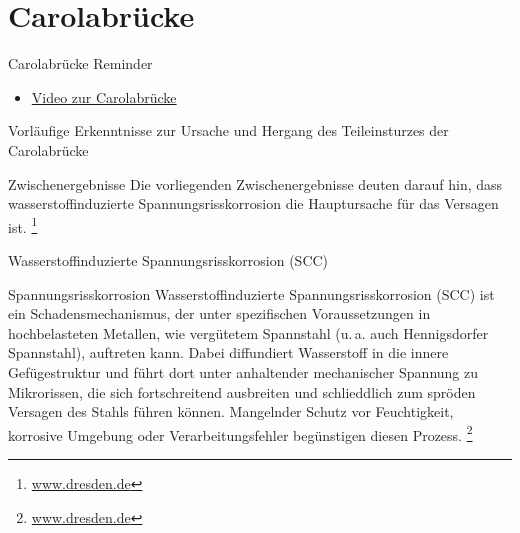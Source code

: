 \section{Carolabrücke}
\BlueSectionSlide

\begin{frame}{Carolabrücke Reminder}
    \begin{itemize}
        \item \href{https://www.youtube.com/watch?v=8PvhMLrxSYA}{Video zur Carolabrücke}
    \end{itemize}
\end{frame}


\begin{frame}{Vorläufige Erkenntnisse zur Ursache und Hergang des Teileinsturzes der Carolabrücke}
    \begin{block}{Zwischenergebnisse}
        Die vorliegenden Zwischenergebnisse deuten darauf hin, dass wasserstoffinduzierte Spannungsrisskorrosion die Hauptursache für das Versagen ist.
        \footnote{\href{        \footnote{https://www.dresden.de/media/pdf/presseamt/2024_12_11_Carolabruecke_Zusammenfassung-Ergebnisse.pdf}}{www.dresden.de}}
    \end{block}

\end{frame}

\begin{frame}{Wasserstoffinduzierte Spannungsrisskorrosion (SCC)}
    \begin{Definition_BS}{Spannungsrisskorrosion}
        Wasserstoffinduzierte Spannungsrisskorrosion (SCC) ist ein Schadensmechanismus, der unter spezifischen Voraussetzungen in
        hochbelasteten Metallen, wie vergütetem Spannstahl (u.\,a. auch Hennigsdorfer Spannstahl), auftreten kann. Dabei diffundiert Wasserstoff in die innere Gefügestruktur und führt dort unter anhaltender mechanischer Spannung zu Mikrorissen, die sich fortschreitend ausbreiten und
        schlieddlich zum spröden Versagen des Stahls führen können. Mangelnder Schutz vor Feuchtigkeit, korrosive Umgebung oder
        Verarbeitungsfehler begünstigen diesen Prozess.
        \footnote{\href{        \footnote{https://www.dresden.de/media/pdf/presseamt/2024_12_11_Carolabruecke_Zusammenfassung-Ergebnisse.pdf}}{www.dresden.de}}
    \end{Definition_BS}
\end{frame}


